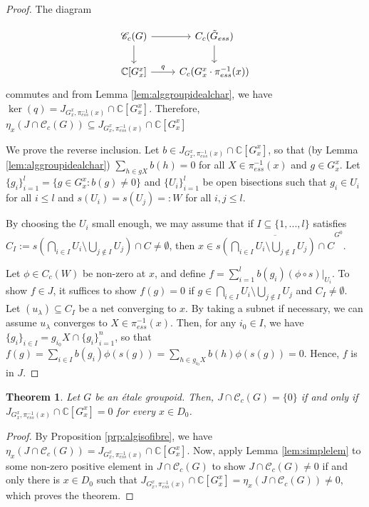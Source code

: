 \documentclass[a4paper, 12pt]{amsart}
\newtheorem{thm}{Theorem}[section]
\theoremstyle{definition}
\theoremstyle{remark}
\numberwithin{equation}{section}
\begin{document}
\begin{proof}
The diagram 

$$
\begin{tikzcd}
\mathscr{C}_{c}(G) \arrow[r] \arrow[d] & C_{c}(\tilde{G}_{ess}) \arrow[d]        \\
{\mathbb{C}[G^{x}_{x}]} \arrow[r, "q"] & C_{c}(G^{x}_{x}\cdot \pi^{-1}_{ess}(x))
\end{tikzcd}$$ commutes and from Lemma \ref{lem:alggroupidealchar}, we have $\ker(q) = J_{G^{x}_{x}, \pi^{-1}_{ess}(x)}\cap\mathbb{C}[G^{x}_{x}]$. Therefore, $\eta_{x}(J\cap\mathscr{C}_{c}(G))\subseteq J_{G^{x}_{x}, \pi^{-1}_{ess}(x)}\cap\mathbb{C}[G^{x}_{x}]$

We prove the reverse inclusion. Let $b\in J_{G^{x}_{x}, \pi^{-1}_{ess}(x)}\cap\mathbb{C}[G^{x}_{x}]$, so that (by Lemma \ref{lem:alggroupidealchar}) $\sum_{h\in gX}b(h) = 0$ for all $X\in\pi_{ess}^{-1}(x)$ and $g\in G^{x}_{x}$. Let $\{g_{i}\}^{l}_{i=1} = \{g\in G^{x}_{x}: b(g)\neq 0\}$ and $\{U_{i}\}^{l}_{i=1}$ be open bisections such that $g_{i}\in U_{i}$ for all $i\leq l$ and $s(U_{i}) = s(U_{j}) =:W$ for all $i,j\leq l$. 

By choosing the $U_{i}$ small enough, we may assume that if $I\subseteq \{1,...,l\}$ satisfies $C_{I}:= s(\bigcap_{i\in I} U_{i}\setminus \bigcup_{j\notin I}U_{j})\cap C\neq \emptyset$, then $x\in \overline{s(\bigcap_{i\in I} U_{i}\setminus \bigcup_{j\notin I}U_{j})\cap C}^{G^{0}}$.

Let $\phi\in C_{c}(W)$ be non-zero at $x$, and define $f = \sum^{l}_{i=1}b(g_{i})(\phi\circ s)|_{U_{i}}.$ To show $f\in J$, it suffices to show $f(g) = 0$ if $g\in \bigcap_{i\in I} U_{i}\setminus \bigcup_{j\notin I}U_{j}$ and $C_{I}\neq\emptyset$. Let $(u_{\lambda})\subseteq C_{I}$ be a net converging to $x$. By taking a subnet if necessary, we can assume $u_{\lambda}$ converges to $X\in \pi_{ess}^{-1}(x)$. Then, for any $i_{0}\in I$, we have $\{g_{i}\}_{i\in I} = g_{i_{0}}X\cap \{g_{i}\}^{n}_{i=1}$, so that $f(g) = \sum_{i\in I}b(g_{i})\phi(s(g)) = \sum_{h\in g_{i_{0}}X}b(h)\phi(s(g)) = 0$. Hence, $f$ is in $J$.
\end{proof}

\begin{thm}
    \label{thm:valgidealfibres}
    Let $G$ be an \'etale groupoid. Then, $J\cap\mathscr{C}_{c}(G) = \{0\}$ if and only if $J_{G^{x}_{x}, \pi^{-1}_{ess}(x)}\cap \mathbb{C}[G^{x}_{x}] = 0$ for every $x\in D_{0}$.
\end{thm}
\begin{proof}
    By Proposition \ref{prp:algisofibre}, we have $\eta_{x}(J\cap\mathscr{C}_{c}(G)) =J_{G^{x}_{x}, \pi^{-1}_{ess}(x)}\cap \mathbb{C}[G^{x}_{x}]$.  Now, apply Lemma \ref{lem:simplelem} to some non-zero positive element in $J\cap\mathscr{C}_{c}(G)$ to show $J\cap\mathscr{C}_{c}(G)\neq 0$ if and only there is $x\in D_{0}$ such that $J_{G^{x}_{x}, \pi^{-1}_{ess}(x)}\cap \mathbb{C}[G^{x}_{x}] = \eta_{x}(J\cap\mathscr{C}_{c}(G)) \neq 0$, which proves the theorem.
\end{proof}
\end{document}

